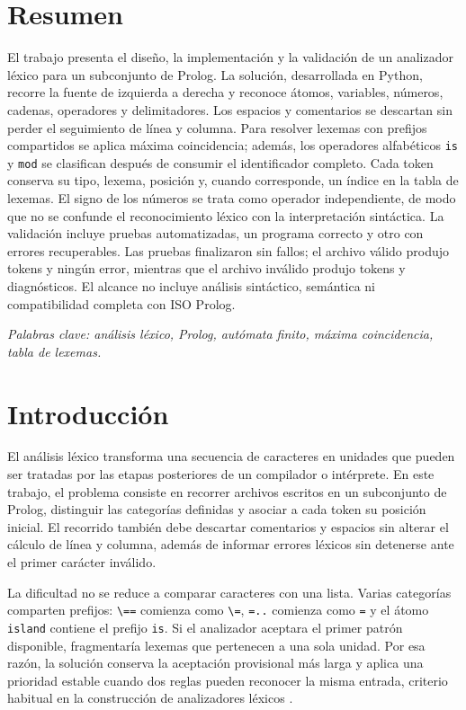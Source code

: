 \section*{Resumen}

El trabajo presenta el diseño, la implementación y la validación de un analizador léxico para un subconjunto de Prolog. La solución, desarrollada en Python, recorre la fuente de izquierda a derecha y reconoce átomos, variables, números, cadenas, operadores y delimitadores. Los espacios y comentarios se descartan sin perder el seguimiento de línea y columna. Para resolver lexemas con prefijos compartidos se aplica máxima coincidencia; además, los operadores alfabéticos \texttt{is} y \texttt{mod} se clasifican después de consumir el identificador completo. Cada token conserva su tipo, lexema, posición y, cuando corresponde, un índice en la tabla de lexemas. El signo de los números se trata como operador independiente, de modo que no se confunde el reconocimiento léxico con la interpretación sintáctica. La validación incluye \PruebasTotal{} pruebas automatizadas, un programa correcto y otro con errores recuperables. Las pruebas finalizaron sin fallos; el archivo válido produjo \TokensValidos{} tokens y ningún error, mientras que el archivo inválido produjo \TokensInvalidos{} tokens y \ErroresInvalidos{} diagnósticos. El alcance no incluye análisis sintáctico, semántica ni compatibilidad completa con ISO Prolog.

\textit{Palabras clave: análisis léxico, Prolog, autómata finito, máxima coincidencia, tabla de lexemas.}

\section{Introducción}

El análisis léxico transforma una secuencia de caracteres en unidades que pueden ser tratadas por las etapas posteriores de un compilador o intérprete. En este trabajo, el problema consiste en recorrer archivos escritos en un subconjunto de Prolog, distinguir las categorías definidas y asociar a cada token su posición inicial. El recorrido también debe descartar comentarios y espacios sin alterar el cálculo de línea y columna, además de informar errores léxicos sin detenerse ante el primer carácter inválido.

La dificultad no se reduce a comparar caracteres con una lista. Varias categorías comparten prefijos: \verb|\==| comienza como \verb|\=|, \verb|=..| comienza como \verb|=| y el átomo \texttt{island} contiene el prefijo \texttt{is}. Si el analizador aceptara el primer patrón disponible, fragmentaría lexemas que pertenecen a una sola unidad. Por esa razón, la solución conserva la aceptación provisional más larga y aplica una prioridad estable cuando dos reglas pueden reconocer la misma entrada, criterio habitual en la construcción de analizadores léxicos \cite{dragon}.

